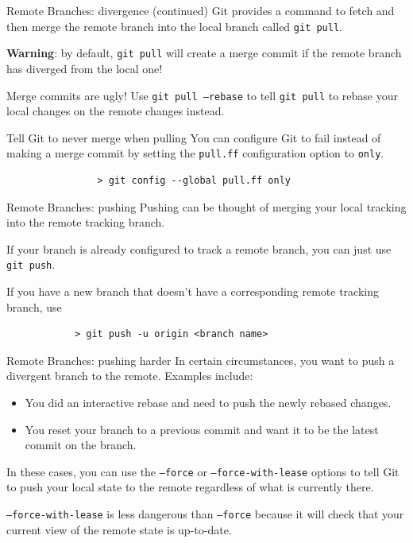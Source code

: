 \documentclass{beeper}
\begin{document}
\begin{frame}[fragile]{Remote Branches: divergence (continued)}
    Git provides a command to fetch and then merge the remote branch into the
    local branch called \texttt{git pull}.
    \pause

    \textbf{Warning}: by default, \texttt{git pull} will create a merge commit
    if the remote branch has diverged from the local one!

    Merge commits are ugly! Use \texttt{git pull --rebase} to tell \texttt{git
    pull} to rebase your local changes on the remote changes instead.
    \pause

    \begin{block}{Tell Git to never merge when pulling}
        You can configure Git to fail instead of making a merge commit by
        setting the \texttt{pull.ff} configuration option to \texttt{only}.
        {
            \begin{verbatim}
                > git config --global pull.ff only
            \end{verbatim}
        }
    \end{block}
\end{frame}

\begin{frame}[fragile]{Remote Branches: pushing}
    Pushing can be thought of merging your local tracking into the remote
    tracking branch.

    If your branch is already configured to track a remote branch, you can just
    use \texttt{git push}.
    \pause

    If you have a new branch that doesn't have a corresponding remote tracking
    branch, use
    {
        \begin{verbatim}
            > git push -u origin <branch name>
        \end{verbatim}
    }
\end{frame}

\begin{frame}[fragile]{Remote Branches: pushing harder}
    In certain circumstances, you want to push a divergent branch to the remote.
    Examples include:

    \begin{itemize}
        \item You did an interactive rebase and need to push the newly rebased
            changes.
        \item You reset your branch to a previous commit and want it to be the
            latest commit on the branch.
    \end{itemize}
    \pause

    In these cases, you can use the \texttt{--force} or
    \texttt{--force-with-lease} options to tell Git to push your local state to
    the remote regardless of what is currently there.

    \texttt{--force-with-lease} is less dangerous than \texttt{--force} because
    it will check that your current view of the remote state is up-to-date.
\end{frame}
\end{document}
